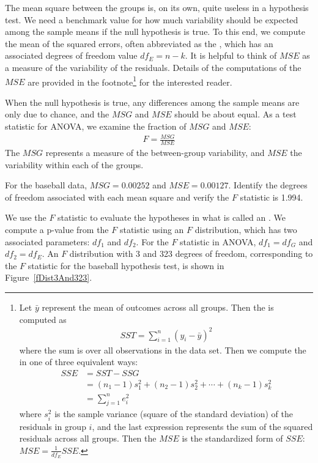 The mean square between the groups is, on its own, quite useless in a hypothesis test. We need a benchmark value for how much variability should be expected among the sample means if the null hypothesis is true. To this end, we compute the mean of the squared errors, often abbreviated as the , which has an associated degrees of freedom value $df_E=n-k$. It is helpful to think of $MSE$ as a measure of the variability of the residuals. Details of the computations of the $MSE$ are provided in the footnote\footnote{Let $\bar{y}$ represent the mean of outcomes across all groups. Then the  is computed as
\begin{align*}
SST = \sum_{i=1}^{n} \left(y_{i} - \bar{y}\right)^2
\end{align*}
where the sum is over all observations in the data set. Then we compute the  in one of three equivalent ways:
\begin{align*}
SSE &= SST - SSG \\
	&= (n_1-1)s_1^2 + (n_2-1)s_2^2 + \cdots + (n_k-1)s_k^2 \\
	&= \sum_{j=1}^{n} e_i^2
\end{align*}
where $s_i^2$ is the sample variance (square of the standard deviation) of the residuals in group $i$, and the last expression represents the sum of the squared residuals across all groups. Then the $MSE$ is the standardized form of $SSE$: $MSE = \frac{1}{df_{E}}SSE$.} for the interested reader.

When the null hypothesis is true, any differences among the sample means are only due to chance, and the $MSG$ and $MSE$ should be about equal. As a test statistic for ANOVA, we examine the fraction of $MSG$ and $MSE$:
\begin{align} \label{formulaForTheFStatistic}
F = \frac{MSG}{MSE}
\end{align}
The $MSG$ represents a measure of the between-group variability, and $MSE$ the variability within each of the groups.

\begin{exercise}
For the baseball data, $MSG = 0.00252$ and $MSE=0.00127$. Identify the degrees of freedom associated with each mean square and verify the $F$ statistic is 1.994.
\end{exercise}

We use the $F$ statistic to evaluate the hypotheses in what is called an . We compute a p-value from the $F$ statistic using an $F$ distribution, which has two associated parameters: $df_{1}$ and $df_{2}$. For the $F$ statistic in ANOVA, $df_{1} = df_{G}$ and $df_{2}= df_{E}$. An $F$ distribution with 3 and 323 degrees of freedom, corresponding to the $F$ statistic for the baseball hypothesis test, is shown in Figure~\ref{fDist3And323}.

